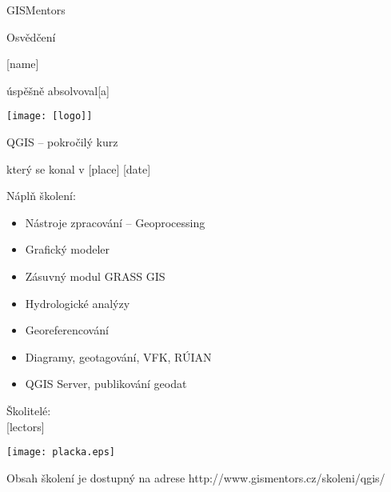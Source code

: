 \documentclass[12pt, a4paper]{letter}
\begin{document}
\pagestyle{empty}
\begin{center}

{\Large GISMentors}

{\Huge Osvědčení}

{\Large [name]}

úspěšně absolvoval[a]

\texttt{[image: [logo]]}

{\Large QGIS -- pokročilý kurz}

který se konal v [place] [date]
\end{center}

Náplň školení:

\begin{itemize}
    \item Nástroje zpracování -- Geoprocessing
    \item Grafický modeler
    \item Zásuvný modul GRASS GIS
    \item Hydrologické analýzy
    \item Georeferencování
    \item Diagramy, geotagování, VFK, RÚIAN
    \item QGIS Server, publikování geodat
\end{itemize}

\vfill
\parbox{7cm}{

        Školitelé: \\

        [lectors]


}
\hfill
\parbox{3cm}{
    \texttt{[image: placka.eps]}
}


\begin{center}
{\footnotesize Obsah školení je dostupný na adrese
http://www.gismentors.cz/skoleni/qgis/}
\end{center}
\end{document}
